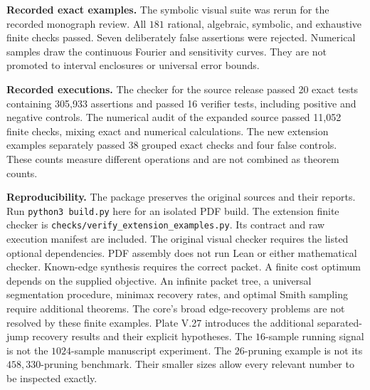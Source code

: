 \textbf{Recorded exact examples.} The symbolic visual suite was rerun for the recorded monograph review. All $181$ rational, algebraic, symbolic, and exhaustive finite checks passed. Seven deliberately false assertions were rejected. Numerical samples draw the continuous Fourier and sensitivity curves. They are not promoted to interval enclosures or universal error bounds.

\textbf{Recorded executions.} The checker for the source release passed 20 exact tests containing 305,933 assertions and passed 16 verifier tests, including positive and negative controls. The numerical audit of the expanded source passed 11,052 finite checks, mixing exact and numerical calculations. The new extension examples separately passed 38 grouped exact checks and four false controls. These counts measure different operations and are not combined as theorem counts.\par
\textbf{Reproducibility.} The package preserves the original sources and their reports. Run \texttt{python3 build.py} here for an isolated PDF build. The extension finite checker is \texttt{checks/verify\_extension\_examples.py}. Its contract and raw execution manifest are included. The original visual checker requires the listed optional dependencies. PDF assembly does not run Lean or either mathematical checker.
Known-edge synthesis requires the correct packet. A finite cost optimum depends on the supplied objective. An infinite packet tree, a universal segmentation procedure, minimax recovery rates, and optimal Smith sampling require additional theorems. The core's broad edge-recovery problems are not resolved by these finite examples. Plate V.27 introduces the additional separated-jump recovery results and their explicit hypotheses.
The $16$-sample running signal is not the $1024$-sample manuscript experiment. The $26$-pruning example is not its $458{,}330$-pruning benchmark. Their smaller sizes allow every relevant number to be inspected exactly.

